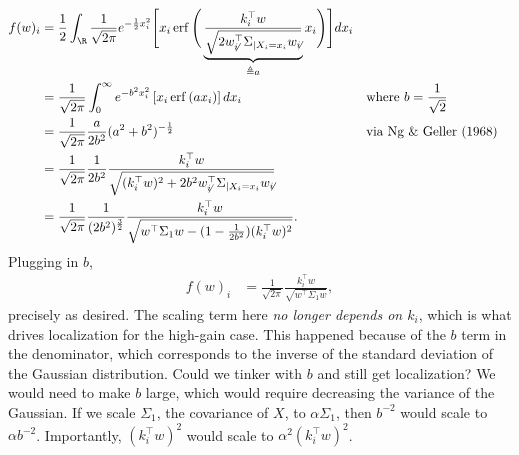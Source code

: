 \documentclass{article}
\begin{document}
\begin{align*}
  f(w)_i 
  &= \frac{1}{2} \int_{\R} \frac{1}{\sqrt{2\pi}} e^{-\frac{1}{2} x_i^2} \Bigg[ x_i \operatorname{erf}\Bigg( \underbrace{ \frac{ k_i^\top w }{ \sqrt{ 2 w_{\not i}^\top \Sigma_{\mid X_i=x_i} w_{\not i} } } }_{\triangleq a} x_i \Bigg) \Bigg] dx_i \\
  &= \frac{1}{\sqrt{2\pi}} \int_0^\infty e^{- b^2 x_i^2} \left[ x_i \operatorname{erf}\left( a x_i \right) \right] dx_i && \text{where } b = \frac{1}{\sqrt{2}} \\
  &= \frac{1}{\sqrt{2\pi}} \frac{a}{2b^2} ( a^2 + b^2 )^{-\frac{1}{2}} && \text{via Ng \& Geller (1968)} \\
  &= \frac{1}{\sqrt{2\pi}} \frac{1}{2b^2} \frac{ k_i^\top w }{ \sqrt{ (k_i^\top w)^2 + 2b^2 w_{\not i}^\top \Sigma_{\mid X_i=x_i} w_{\not i} } } \\
  &= \frac{1}{\sqrt{2\pi}} \frac{1}{(2b^2)^{\frac{3}{2}}} \frac{ k_i^\top w }{ \sqrt{ w^\top \Sigma_1 w - ( 1 - \frac{1}{2b^2} ) (k_i^\top w)^2 } }.
\end{align*}
Plugging in $b$,
\begin{align*}
  f(w)_i 
  &= \frac{1}{\sqrt{2\pi}} \frac{ k_i^\top w }{ \sqrt{ w^\top \Sigma_1 w } },
\end{align*}
precisely as desired.
The scaling term here \emph{no longer depends on $k_i$}, which is what drives localization for the high-gain case.
This happened because of the $b$ term in the denominator, which corresponds to the inverse of the standard deviation of the Gaussian distribution.
Could we tinker with $b$ and still get localization?
We would need to make $b$ large, which would require decreasing the variance of the Gaussian.
If we scale $\Sigma_1$, the covariance of $X$, to $\alpha \Sigma_1$, then $b^{-2}$ would scale to $\alpha b^{-2}$.
Importantly, $(k_i^\top w)^2$ would scale to $\alpha^2 (k_i^\top w)^2$.
\end{document}

